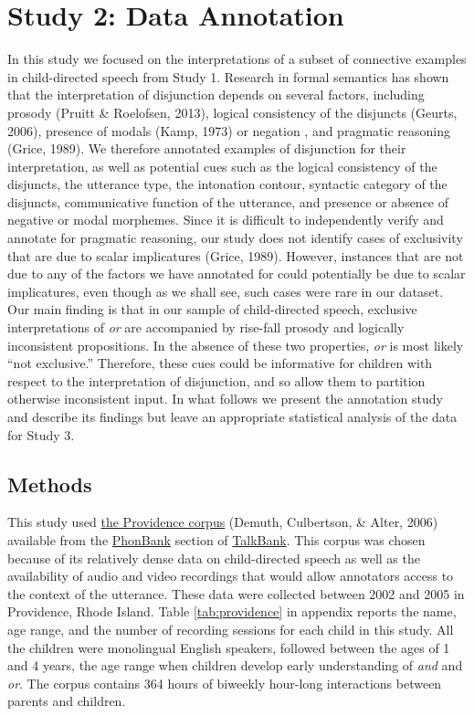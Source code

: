 \documentclass[
  english,
  ,man,floatsintext]{apa6}
\begin{document}
\hypertarget{study-2-data-annotation}{%
\section{Study 2: Data Annotation}\label{study-2-data-annotation}}

In this study we focused on the interpretations of a subset of connective examples in child-directed speech from Study 1. Research in formal semantics has shown that the interpretation of disjunction depends on several factors, including prosody (Pruitt \& Roelofsen, 2013), logical consistency of the disjuncts (Geurts, 2006), presence of modals (Kamp, 1973) or negation , and pragmatic reasoning (Grice, 1989). We therefore annotated examples of disjunction for their interpretation, as well as potential cues such as the logical consistency of the disjuncts, the utterance type, the intonation contour, syntactic category of the disjuncts, communicative function of the utterance, and presence or absence of negative or modal morphemes. Since it is difficult to independently verify and annotate for pragmatic reasoning, our study does not identify cases of exclusivity that are due to scalar implicatures (Grice, 1989). However, instances that are not due to any of the factors we have annotated for could potentially be due to scalar implicatures, even though as we shall see, such cases were rare in our dataset. Our main finding is that in our sample of child-directed speech, exclusive interpretations of \emph{or} are accompanied by rise-fall prosody and logically inconsistent propositions. In the absence of these two properties, \emph{or} is most likely ``not exclusive.'' Therefore, these cues could be informative for children with respect to the interpretation of disjunction, and so allow them to partition otherwise inconsistent input. In what follows we present the annotation study and describe its findings but leave an appropriate statistical analysis of the data for Study 3.

\hypertarget{methods-1}{%
\subsection{Methods}\label{methods-1}}

This study used \href{https://phonbank.talkbank.org/browser/index.php?url=Eng-NA/Providence/}{the Providence corpus} (Demuth, Culbertson, \& Alter, 2006) available from the \href{https://phonbank.talkbank.org}{PhonBank} section of \href{https://talkbank.org/}{TalkBank}. This corpus was chosen because of its relatively dense data on child-directed speech as well as the availability of audio and video recordings that would allow annotators access to the context of the utterance. These data were collected between 2002 and 2005 in Providence, Rhode Island. Table \ref{tab:providence} in appendix reports the name, age range, and the number of recording sessions for each child in this study. All the children were monolingual English speakers, followed between the ages of 1 and 4 years, the age range when children develop early understanding of \emph{and} and \emph{or}. The corpus contains 364 hours of biweekly hour-long interactions between parents and children.
\end{document}
